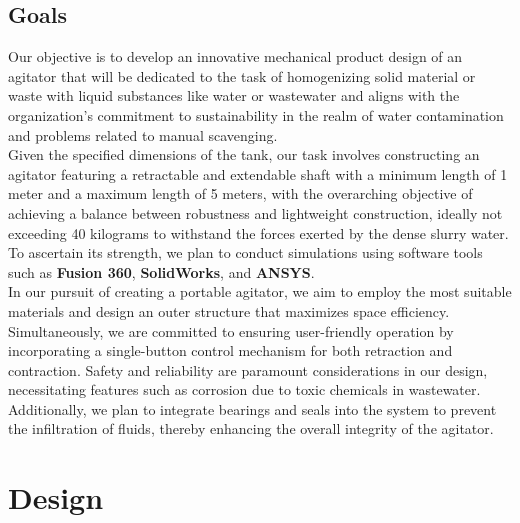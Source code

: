\documentclass[a4,10pt]{report}
\begin{document}
\section{Goals}
Our objective is to develop an innovative mechanical product design of an agitator that will be dedicated to the task of homogenizing solid material or waste with liquid substances like water or wastewater and aligns with the organization's commitment to sustainability in the realm of water contamination and problems related to manual scavenging. 
\vspace{2mm} \\
Given the specified dimensions of the tank, our task involves constructing an agitator featuring a retractable and extendable shaft with a minimum length of 1 meter and a maximum length of 5 meters, with the overarching objective of achieving a balance between robustness and lightweight construction, ideally not exceeding 40 kilograms to withstand the forces exerted by the dense slurry water. To ascertain its strength, we plan to conduct simulations using software tools such as \textbf{Fusion 360}, \textbf{SolidWorks}, and \textbf{ANSYS}. 
\vspace{2mm} \\
In our pursuit of creating a portable agitator, we aim to employ the most suitable materials and design an outer structure that maximizes space efficiency. Simultaneously, we are committed to ensuring user-friendly operation by incorporating a single-button control mechanism for both retraction and contraction. Safety and reliability are paramount considerations in our design, necessitating features such as corrosion due to toxic chemicals in wastewater. Additionally, we plan to integrate bearings and seals into the system to prevent the infiltration of fluids, thereby enhancing the overall integrity of the agitator.

\newpage

\chapter{Design}
\end{document}
